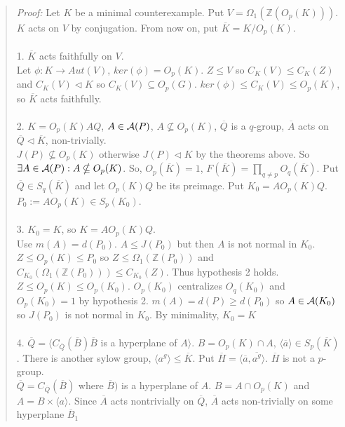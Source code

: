 \begin{quote}
\emph{Proof:}  Let $K$ be a minimal counterexample.  Put $V= \Omega_1({\mathbb Z}(O_p(K)))$. $K$ acts on $V$ by
conjugation. From now on, put ${\overline K} = K/O_p(K)$.
\\
\\
1. ${\overline K}$ acts faithfully on $V$.\\
Let $\phi: K \rightarrow Aut(V)$, $ker(\phi) = O_p(K)$.
$Z \leq V$ so $C_K(V) \leq C_K(Z)$ and $C_K(V) \lhd K$ so $C_K(V) \subseteq O_p(G)$.  $ ker(\phi) \leq C_K(V) \leq O_p(K)$,
so ${\overline K}$ acts faithfully.
\\
\\
2. $K= O_p(K) A Q$, $A \in {\cal A}(P)$, $A \nsubseteq O_p(K)$, ${\overline Q}$ is a $q$-group, ${\overline A}$ acts on
${\overline Q} \lhd {\overline K}$, non-trivially. \\
$J(P) \nsubseteq O_p(K)$ otherwise $J(P) \lhd K$ by the theorems above.  So $\exists A \in {\cal A}(P): A \nsubseteq O_p(K)$.
So, $O_p({\overline K}) = 1$, $F({\overline K})= \prod_{q \ne p} O_q({\overline K})$.  Put ${\overline Q} \in S_q({\overline K})$
and let $O_p(K) Q$ be its preimage.  Put $K_0 = A O_p(K)Q$.  $P_0 := A O_p(K) \in S_p(K_0)$.
\\
\\
3. $K_0=K$, so $K= A O_p(K)Q$. \\
Use $m(A)=d(P_0)$. $A \leq J(P_0)$ but then $A$ is not normal in $K_0$. $Z \leq O_p(K) \leq P_0$ so $Z \leq \Omega_1({\mathbb Z}(P_0))$ and
$C_{K_0}(\Omega_1({\mathbb Z}(P_0))) \leq C_{K_0}(Z)$. Thus hypothesis 2 holds.  $Z \leq O_p(K) \leq O_p(K_0)$.  $O_p(K_0)$ centralizes $O_q(K_0)$
and $O_p(K_0)=1$ by hypothesis 2.  $m(A) =d(P) \geq d(P_0)$ so $A \in {\cal A}(K_0)$ so $J(P_0)$ is not normal in $K_0$.  By minimality, $K_0 = K$
\\
\\
4. ${\overline Q} = \langle C_{\overline Q}({\overline B}) {\overline B}$ is a hyperplane of $A \rangle$.
$B= O_p(K) \cap A$, $\langle {\overline a} \rangle \in S_p({\overline K})$.  There is another sylow group,
$\langle a^g \rangle \leq {\overline K}$.  Put ${\overline H}= \langle {\overline a}, {\overline {a^g}} \rangle$. ${\overline H}$
is not a $p$-group.\\
${\overline Q} =C_{\overline Q}({\overline B})$  where ${\overline B})$ is a hyperplane of $A$.
$B= A \cap O_p(K)$ and $A= B \times \langle a \rangle$.
Since ${\overline A}$  acts nontrivially on ${\overline Q}$, ${\overline A}$ acts non-trivially on some hyperplane ${\overline B_1}$

\end{quote}

